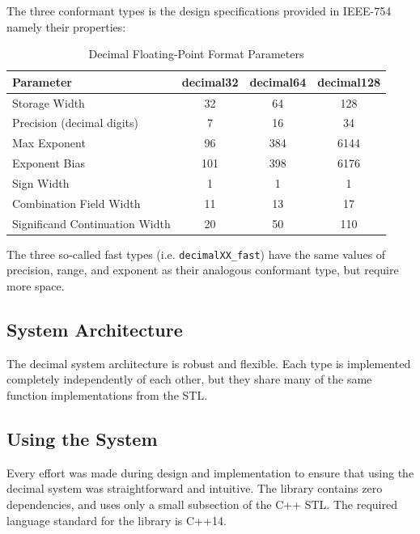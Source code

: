 \documentclass[acmsmall]{acmart}
\newcommand{\code}[1]{\texttt{#1}}
\begin{document}
The three conformant types is  the design specifications provided in IEEE-754 namely their properties:

\begin{table}[H]
\centering
\begin{tabular}{|l|c|c|c|}
\hline
\textbf{Parameter} & \textbf{decimal32} & \textbf{decimal64} & \textbf{decimal128} \\
\hline
Storage Width & 32 & 64 & 128 \\
\hline
Precision (decimal digits) & 7 & 16 & 34 \\
\hline
Max Exponent & 96 & 384 & 6144 \\
\hline
Exponent Bias & 101 & 398 & 6176 \\
\hline
Sign Width & 1 & 1 & 1 \\
\hline
Combination Field Width & 11 & 13 & 17 \\
\hline
Significand Continuation Width & 20 & 50 & 110 \\
\hline
\end{tabular}
\caption{Decimal Floating-Point Format Parameters}
\label{tab:decimal_params}
\end{table}

The three so-called fast types (i.e. \code{decimalXX\_fast}) have the same values of precision, range, and exponent as their analogous conformant type, but require more space.

\subsection{System Architecture}

The decimal system architecture is robust and flexible.
Each type is implemented completely independently of each other, but they share many of the same function implementations from the STL.

\subsection{Using the System}

Every effort was made during design and implementation to ensure that using the decimal system was straightforward and intuitive.
The library contains zero dependencies, and uses only a small subsection of the C++ STL.
The required language standard for the library is C++14.
\end{document}
